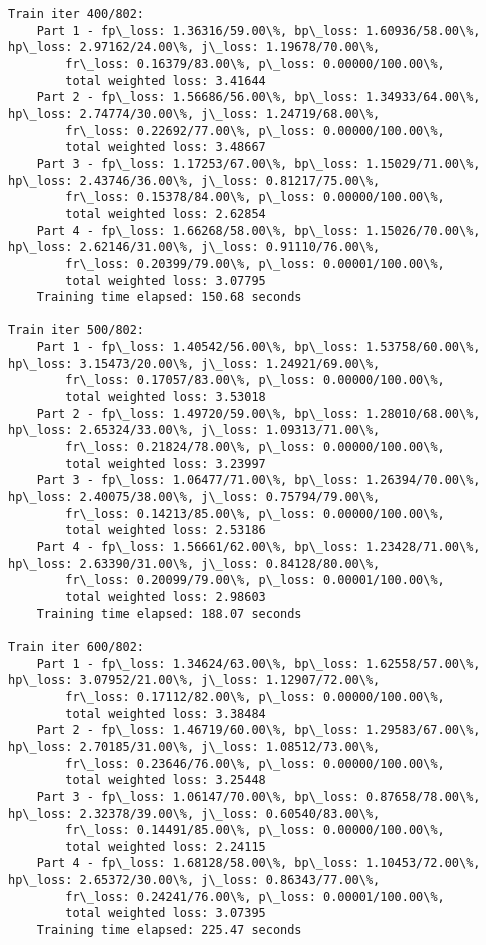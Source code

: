 \documentclass[11pt]{article}
\begin{document}
\begin{Verbatim}[commandchars=\\\{\}]
Train iter 400/802:
	Part 1 - fp\_loss: 1.36316/59.00\%, bp\_loss: 1.60936/58.00\%, hp\_loss: 2.97162/24.00\%, j\_loss: 1.19678/70.00\%, 
		fr\_loss: 0.16379/83.00\%, p\_loss: 0.00000/100.00\%, 
		total weighted loss: 3.41644
	Part 2 - fp\_loss: 1.56686/56.00\%, bp\_loss: 1.34933/64.00\%, hp\_loss: 2.74774/30.00\%, j\_loss: 1.24719/68.00\%, 
		fr\_loss: 0.22692/77.00\%, p\_loss: 0.00000/100.00\%, 
		total weighted loss: 3.48667
	Part 3 - fp\_loss: 1.17253/67.00\%, bp\_loss: 1.15029/71.00\%, hp\_loss: 2.43746/36.00\%, j\_loss: 0.81217/75.00\%, 
		fr\_loss: 0.15378/84.00\%, p\_loss: 0.00000/100.00\%, 
		total weighted loss: 2.62854
	Part 4 - fp\_loss: 1.66268/58.00\%, bp\_loss: 1.15026/70.00\%, hp\_loss: 2.62146/31.00\%, j\_loss: 0.91110/76.00\%, 
		fr\_loss: 0.20399/79.00\%, p\_loss: 0.00001/100.00\%, 
		total weighted loss: 3.07795
	Training time elapsed: 150.68 seconds

Train iter 500/802:
	Part 1 - fp\_loss: 1.40542/56.00\%, bp\_loss: 1.53758/60.00\%, hp\_loss: 3.15473/20.00\%, j\_loss: 1.24921/69.00\%, 
		fr\_loss: 0.17057/83.00\%, p\_loss: 0.00000/100.00\%, 
		total weighted loss: 3.53018
	Part 2 - fp\_loss: 1.49720/59.00\%, bp\_loss: 1.28010/68.00\%, hp\_loss: 2.65324/33.00\%, j\_loss: 1.09313/71.00\%, 
		fr\_loss: 0.21824/78.00\%, p\_loss: 0.00000/100.00\%, 
		total weighted loss: 3.23997
	Part 3 - fp\_loss: 1.06477/71.00\%, bp\_loss: 1.26394/70.00\%, hp\_loss: 2.40075/38.00\%, j\_loss: 0.75794/79.00\%, 
		fr\_loss: 0.14213/85.00\%, p\_loss: 0.00000/100.00\%, 
		total weighted loss: 2.53186
	Part 4 - fp\_loss: 1.56661/62.00\%, bp\_loss: 1.23428/71.00\%, hp\_loss: 2.63390/31.00\%, j\_loss: 0.84128/80.00\%, 
		fr\_loss: 0.20099/79.00\%, p\_loss: 0.00001/100.00\%, 
		total weighted loss: 2.98603
	Training time elapsed: 188.07 seconds

Train iter 600/802:
	Part 1 - fp\_loss: 1.34624/63.00\%, bp\_loss: 1.62558/57.00\%, hp\_loss: 3.07952/21.00\%, j\_loss: 1.12907/72.00\%, 
		fr\_loss: 0.17112/82.00\%, p\_loss: 0.00000/100.00\%, 
		total weighted loss: 3.38484
	Part 2 - fp\_loss: 1.46719/60.00\%, bp\_loss: 1.29583/67.00\%, hp\_loss: 2.70185/31.00\%, j\_loss: 1.08512/73.00\%, 
		fr\_loss: 0.23646/76.00\%, p\_loss: 0.00000/100.00\%, 
		total weighted loss: 3.25448
	Part 3 - fp\_loss: 1.06147/70.00\%, bp\_loss: 0.87658/78.00\%, hp\_loss: 2.32378/39.00\%, j\_loss: 0.60540/83.00\%, 
		fr\_loss: 0.14491/85.00\%, p\_loss: 0.00000/100.00\%, 
		total weighted loss: 2.24115
	Part 4 - fp\_loss: 1.68128/58.00\%, bp\_loss: 1.10453/72.00\%, hp\_loss: 2.65372/30.00\%, j\_loss: 0.86343/77.00\%, 
		fr\_loss: 0.24241/76.00\%, p\_loss: 0.00001/100.00\%, 
		total weighted loss: 3.07395
	Training time elapsed: 225.47 seconds


\end{Verbatim}
\end{document}
